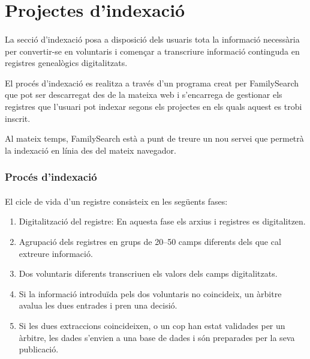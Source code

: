 \section{Projectes d'indexació}

    \paragraph{}
    La secció d’indexació posa a disposició dels usuaris tota la informació necessària per convertir-se en voluntaris i començar a transcriure informació continguda en registres genealògics digitalitzats.

    El procés d’indexació es realitza a través d’un programa creat per FamilySearch que pot ser descarregat des de la mateixa web i s’encarrega de gestionar els registres que l’usuari pot indexar segons els projectes en els quals aquest es trobi inscrit.

    Al mateix temps, FamilySearch està a punt de treure un nou servei que permetrà la indexació en línia des del mateix navegador.


    \subsubsection{Procés d'indexació}

        \paragraph{}
        El cicle de vida d’un registre consisteix en les següents fases:

        \begin{enumerate}
            \item Digitalització del registre: En aquesta fase els arxius i registres es digitalitzen.
            \item Agrupació dels registres en grups de 20--50 camps diferents dels que cal extreure informació.
            \item Dos voluntaris diferents transcriuen els valors dels camps digitalitzats.
            \item Si la informació introduïda pels dos voluntaris no coincideix, un àrbitre avalua les dues entrades i pren una decisió.
            \item Si les dues extraccions coincideixen, o un cop han estat validades per un àrbitre, les dades s’envien a una base de dades i són preparades per la seva publicació.
        \end{enumerate}

